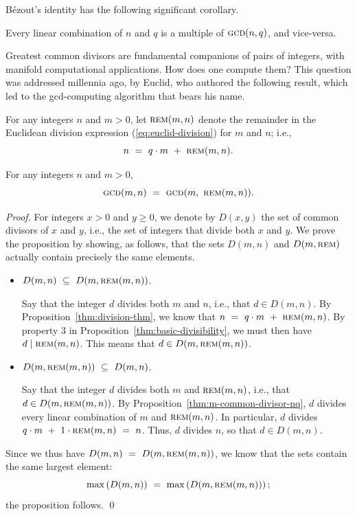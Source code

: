 B\'{e}zout's identity has the following significant corollary.

\begin{corol}
Every linear combination of $n$ and $q$ is a multiple of $\mbox{\sc
  gcd}(n,q)$, and vice-versa.
\end{corol}

Greatest common divisors are fundamental companions of pairs of
integers, with manifold computational applications.  How does one
compute them?  This question was addressed millennia ago, by Euclid,
 who authored the following result, which led to the
{\sc gcd}-computing algorithm that bears his name.

For any integers $n$ and $m > 0$, let $\mbox{\sc rem}(m,n)$ denote the
remainder in the Euclidean division expression (\ref{eq:euclid-division})
for $m$ and $n$; i.e.,
\[ n \ = \ q \cdot m \ + \ \mbox{\sc rem}(m,n). \]

\begin{prop}
\label{thm:gcd-basis}
For any integers $n$ and $m > 0$,
\[ \mbox{\sc gcd}(m,n) \ = \  \mbox{\sc gcd}(m, \ \mbox{\sc rem}(m,n)) . \]
\end{prop}

\begin{proof}
For integers $x > 0$ and $y \geq 0$, we denote by $D(x,y)$ the set of
common divisors of $x$ and $y$, i.e., the set of integers that divide
both $x$ and $y$.  We prove the proposition by showing, as follows,
that the sets $D(m, n)$ and $D(m, \mbox{\sc rem})$ actually contain
precisely the same elements.
\begin{itemize}
\item 
$D(m, n) \ \subseteq \ D(m, \mbox{\sc rem}(m,n))$.

Say that the integer $d$ divides both $m$ and $n$, i.e., that $d \in
D(m,n)$.  By Proposition~\ref{thm:division-thm}, we know that $n \ =
\ q \cdot m \ + \ \mbox{\sc rem}(m,n)$.  By property 3 in
Proposition~\ref{thm:basic-divisibility}, we must then have $d \mid
\mbox{\sc rem}(m,n)$.  This means that $d \in D(m, \mbox{\sc rem}(m,n))$.

\item 
$D(m, \mbox{\sc rem}(m,n)) \ \subseteq \ D(m,n)$.

Say that the integer $d$ divides both $m$ and $\mbox{\sc rem}(m,n)$,
i.e., that $d \in D(m, \mbox{\sc rem}(m,n))$.  By
Proposition~\ref{thm:m-common-divisor-nq}, $d$ divides every linear
combination of $m$ and $\mbox{\sc rem}(m,n)$.  In particular, $d$
divides $q \cdot m \ + \ 1 \cdot \mbox{\sc rem}(m,n) \ = \ n$.  Thus,
$d$ divides $n$, so that $d \in D(m,n)$.
\end{itemize}
Since we thus have $D(m, n) \ = \ D(m, \mbox{\sc rem}(m,n))$, we know
that the sets contain the same largest element:
\[ \max\left( D(m, n) \right) \ = \ \max\left( D(m, \mbox{\sc
  rem}(m,n)) \right);
\]
the proposition follows.
\qed
\end{proof}

